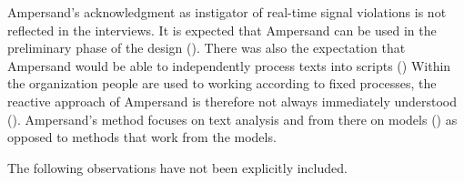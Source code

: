 Ampersand's acknowledgment as instigator of real-time signal violations is not reflected in the interviews.
It is expected that Ampersand can be used in the preliminary phase of the design ().
There was also the expectation that Ampersand would be able to independently process texts into scripts ()
Within the organization people are used to working according to fixed processes, the reactive approach of Ampersand is therefore not always immediately understood ().
Ampersand's method focuses on text analysis and from there on models () as opposed to methods that work from the models.

The following observations have not been explicitly included.

